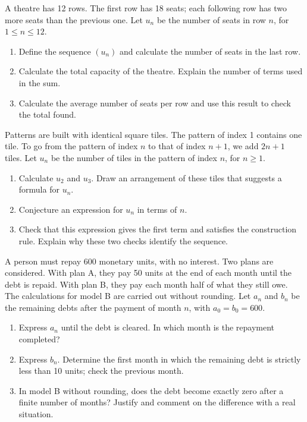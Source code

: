 A theatre has 12 rows. The first row has 18 seats; each following row has two more seats than the previous one. Let $u_n$ be the number of seats in row $n$, for $1\leq n\leq12$.
\begin{enumerate}[label=\arabic*.]
\item Define the sequence $(u_n)$ and calculate the number of seats in the last row.
\item Calculate the total capacity of the theatre. Explain the number of terms used in the sum.
\item Calculate the average number of seats per row and use this result to check the total found.
\end{enumerate}
Patterns are built with identical square tiles. The pattern of index 1 contains one tile. To go from the pattern of index $n$ to that of index $n+1$, we add $2n+1$ tiles. Let $u_n$ be the number of tiles in the pattern of index $n$, for $n\geq1$.
\begin{enumerate}[label=\arabic*.]
\item Calculate $u_2$ and $u_3$. Draw an arrangement of these tiles that suggests a formula for $u_n$.
\item Conjecture an expression for $u_n$ in terms of $n$.
\item Check that this expression gives the first term and satisfies the construction rule. Explain why these two checks identify the sequence.
\end{enumerate}

A person must repay 600 monetary units, with no interest. Two plans are considered. With plan A, they pay 50 units at the end of each month until the debt is repaid. With plan B, they pay each month half of what they still owe. The calculations for model B are carried out without rounding. Let $a_n$ and $b_n$ be the remaining debts after the payment of month $n$, with $a_0=b_0=600$.
\begin{enumerate}[label=\arabic*.]
\item Express $a_n$ until the debt is cleared. In which month is the repayment completed?
\item Express $b_n$. Determine the first month in which the remaining debt is strictly less than 10 units; check the previous month.
\item In model B without rounding, does the debt become exactly zero after a finite number of months? Justify and comment on the difference with a real situation.
\end{enumerate}
